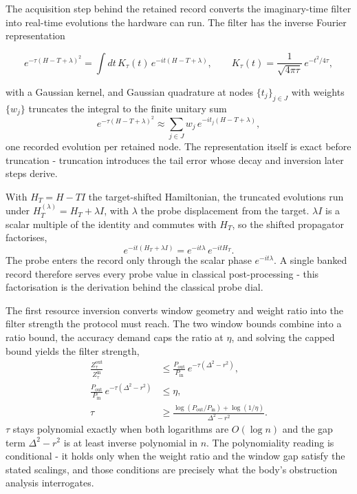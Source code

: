 The acquisition step behind the retained record converts the imaginary-time filter into real-time evolutions the hardware can run. The filter has the inverse Fourier representation
\begin{widetext}
\begin{equation*}
e^{-\tau (H - T + \lambda)^2} = \int dt \, K_\tau(t) \, e^{-i t (H - T + \lambda)} , \qquad
K_\tau(t) = \frac{1}{\sqrt{4 \pi \tau}} \, e^{-t^2 / 4\tau} ,
\end{equation*}
\end{widetext}
with a Gaussian kernel, and Gaussian quadrature at nodes $\{t_j\}_{j \in J}$ with weights $\{w_j\}$ truncates the integral to the finite unitary sum
\begin{equation*}
e^{-\tau (H - T + \lambda)^2} \approx \sum_{j \in J} w_j \, e^{-i t_j (H - T + \lambda)} ,
\end{equation*}
one recorded evolution per retained node. The representation itself is exact before truncation - truncation introduces the tail error whose decay and inversion later steps derive.

With $H_T = H - T I$ the target-shifted Hamiltonian, the truncated evolutions run under $H_T^{(\lambda)} = H_T + \lambda I$, with $\lambda$ the probe displacement from the target. $\lambda I$ is a scalar multiple of the identity and commutes with $H_T$, so the shifted propagator factorises,
\begin{equation*}
e^{-i t (H_T + \lambda I)} = e^{-i t \lambda} \, e^{-i t H_T} .
\end{equation*}
The probe enters the record only through the scalar phase $e^{-i t \lambda}$. A single banked record therefore serves every probe value in classical post-processing - this factorisation is the derivation behind the classical probe dial.

The first resource inversion converts window geometry and weight ratio into the filter strength the protocol must reach. The two window bounds combine into a ratio bound, the accuracy demand caps the ratio at $\eta$, and solving the capped bound yields the filter strength,
\begin{align*}
\frac{Z_\tau^{\mathrm{out}}}{Z_\tau^{\mathrm{in}}}
&\le \frac{P_{\mathrm{out}}}{P_{\mathrm{in}}} \, e^{-\tau (\Delta^2 - r^2)} , \\
\frac{P_{\mathrm{out}}}{P_{\mathrm{in}}} \, e^{-\tau (\Delta^2 - r^2)} &\le \eta , \\
\tau &\ge \frac{\log(P_{\mathrm{out}}/P_{\mathrm{in}}) + \log(1/\eta)}{\Delta^2 - r^2} .
\end{align*}
$\tau$ stays polynomial exactly when both logarithms are $O(\log n)$ and the gap term $\Delta^2 - r^2$ is at least inverse polynomial in $n$. The polynomiality reading is conditional - it holds only when the weight ratio and the window gap satisfy the stated scalings, and those conditions are precisely what the body's obstruction analysis interrogates.

